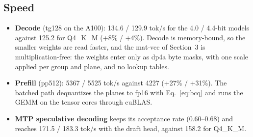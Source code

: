 \documentclass[11pt]{article}
\begin{document}
\subsection{Speed}
\begin{itemize}
\item \textbf{Decode} (tg128 on the A100): 134.6 / 129.9 tok/s for the 4.0 / 4.4-bit models against 125.2 for
  Q4\_K\_M (+8\% / +4\%). Decode is memory-bound, so the smaller weights are read faster, and the mat-vec of
  Section~3 is multiplication-free: the weights enter only as dp4a byte masks, with one scale applied per group and
  plane, and no lookup tables.
\item \textbf{Prefill} (pp512): 5367 / 5525 tok/s against 4227 (+27\% / +31\%). The batched path dequantizes the planes
  to fp16 with Eq.~\eqref{eq:bcq} and runs the GEMM on the tensor cores through cuBLAS.
\item \textbf{MTP speculative decoding} keeps its acceptance rate (0.60--0.68) and reaches 171.5 / 183.3 tok/s with the
  draft head, against 158.2 for Q4\_K\_M.
\end{itemize}
\end{document}
